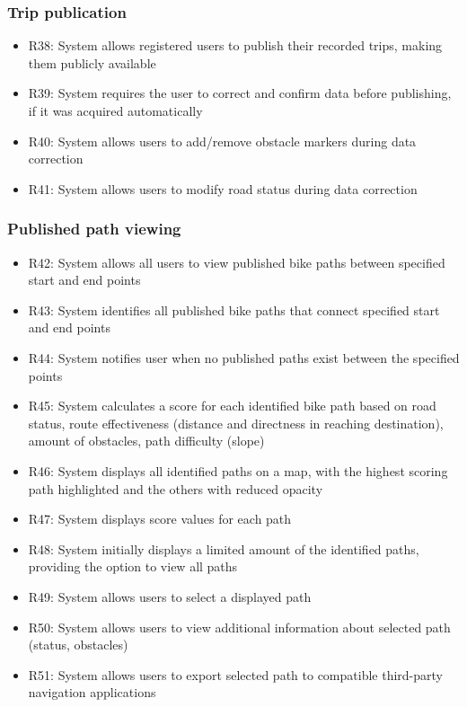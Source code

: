 \subsubsection*{Trip publication}
\begin{itemize}
   \item R38: System allows registered users to publish their recorded trips, making them publicly available
   \item R39: System requires the user to correct and confirm data before publishing, if it was acquired automatically
   \item R40: System allows users to add/remove obstacle markers during data correction
   \item R41: System allows users to modify road status during data correction
\end{itemize}

\subsubsection*{Published path viewing}
\begin{itemize}
   \item R42: System allows all users to view published bike paths between specified start and end points
   \item R43: System identifies all published bike paths that connect specified start and end points
   \item R44: System notifies user when no published paths exist between the specified points
   \item R45: System calculates a score for each identified bike path based on road status, route effectiveness (distance and directness in reaching destination), amount of obstacles, path difficulty (slope)
   \item R46: System displays all identified paths on a map, with the highest scoring path highlighted and the others with reduced opacity
   \item R47: System displays score values for each path
   \item R48: System initially displays a limited amount of the identified paths, providing the option to view all paths
   \item R49: System allows users to select a displayed path
   \item R50: System allows users to view additional information about selected path (status, obstacles)
   \item R51: System allows users to export selected path to compatible third-party navigation applications
\end{itemize}

